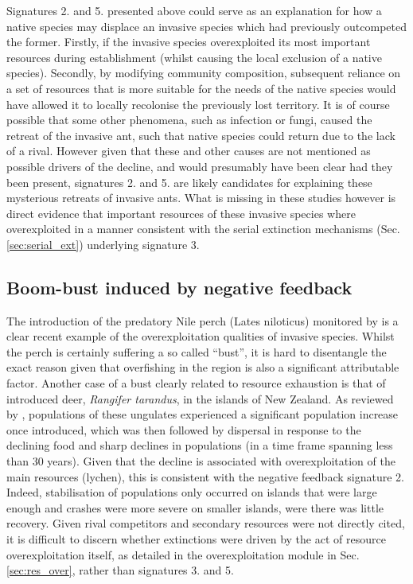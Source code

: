 \documentclass[a4paper]{report}
\begin{document}
Signatures 2. and 5. presented above could serve as an explanation for how a native species may displace an invasive species which had previously outcompeted the former. Firstly, if the invasive species overexploited its most important resources during establishment (whilst causing the local exclusion of a native species). Secondly, by modifying community composition, subsequent reliance on a set of resources that is more suitable for the needs of the native species would have allowed it to locally recolonise the previously lost territory. It is of course possible that some other phenomena, such as infection or fungi, caused the retreat of the invasive ant, such that native species could return due to the lack of a rival. However given that these and other causes are not mentioned as possible drivers of the decline, and would presumably have been clear had they been present, signatures 2. and 5. are likely candidates for explaining these mysterious retreats of invasive ants. What is missing in these studies however is direct evidence that important resources of these invasive species where overexploited in a manner consistent with the serial extinction mechanisms (Sec. \ref{sec:serial_ext}) underlying signature 3.

\subsection{Boom-bust induced by negative feedback}

The introduction of the predatory Nile perch (Lates niloticus) monitored by \citep{Mkumbo2015} is a clear recent example of the overexploitation qualities of invasive species. Whilst the perch is certainly suffering a so called “bust”, it is hard to disentangle the exact reason given that overfishing in the region is also a significant attributable factor. Another case of a bust clearly related to resource exhaustion is that of introduced deer, \textit{Rangifer tarandus}, in the islands of New Zealand. As reviewed by \citep{Simberloff2004}, populations of these ungulates experienced a significant population increase once introduced, which was then followed by dispersal in response to the declining food and sharp declines in populations (in a time frame spanning less than 30 years). Given that the decline is associated with overexploitation of the main resources (lychen), this is consistent with the negative feedback signature 2. Indeed, stabilisation of populations only occurred on islands that were large enough and crashes were more severe on smaller islands, were there was little recovery. Given rival competitors and secondary resources were not directly cited, it is difficult to discern whether extinctions were driven by the act of resource overexploitation itself, as detailed in the overexploitation module in Sec. \ref{sec:res_over}, rather than signatures 3. and 5. 
\end{document}
